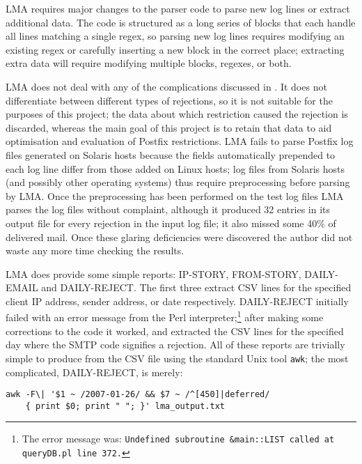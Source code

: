 \gls{LMA} requires major changes to the parser code to parse new log lines
or extract additional data.  The code is structured as a long series of
blocks that each handle all lines matching a single regex, so parsing new
log lines requires modifying an existing regex or carefully inserting a new
block in the correct place; extracting extra data will require modifying
multiple blocks, regexes, or both.

\gls{LMA} does not deal with any of the complications discussed in
.  It does not differentiate between different
types of rejections, so it is not suitable for the purposes of this
project; the data about which restriction caused the rejection is
discarded, whereas the main goal of this project is to retain that data to
aid optimisation and evaluation of Postfix restrictions.  \gls{LMA} fails
to parse Postfix log files generated on Solaris hosts because the fields
automatically prepended to each log line differ from those added on Linux
hosts; log files from Solaris hosts (and possibly other operating systems)
thus require preprocessing before parsing by \gls{LMA}.  Once the
preprocessing has been performed on the \numberOFlogFILES{} test log files
\gls{LMA} parses the log files without complaint, although it produced 32
entries in its output file for every rejection in the input log file; it
also missed some 40\% of delivered mail.  Once these glaring deficiencies
were discovered the author did not waste any more time checking the
results.

\gls{LMA} does provide some simple reports: IP-STORY, FROM-STORY,
DAILY-EMAIL and DAILY-REJECT\@.  The first three extract \gls{CSV} lines
for the specified client \gls{IP} address, sender address, or date
respectively.  DAILY-REJECT initially failed with an error message from the
Perl interpreter;\footnote{The error message was:
\newline{}\texttt{Undefined subroutine \&main::LIST called at queryDB.pl
line 372.}} after making some corrections to the code it worked, and
extracted the \gls{CSV} lines for the specified day where the \gls{SMTP}
code signifies a rejection.  All of these reports are trivially simple to
produce from the \gls{CSV} file using the standard Unix tool
\texttt{awk}; the most complicated, DAILY-REJECT, is merely:

\begin{verbatim}
awk -F\| '$1 ~ /2007-01-26/ && $7 ~ /^[450]|deferred/
    { print $0; print " "; }' lma_output.txt
\end{verbatim}


